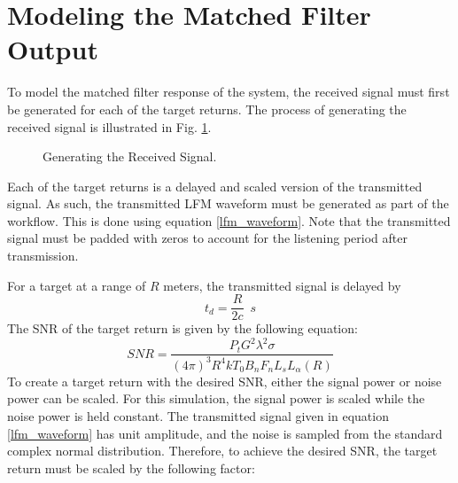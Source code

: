 \documentclass[conference]{IEEEtran}
\begin{document}
\section{Modeling the Matched Filter Output}
\label{modeling_section}
To model the matched filter response of the system, the received signal must first be generated for each of the target returns. The process of generating the received signal is illustrated in Fig. \ref{gen_rx_sig}.
\begin{figure}[H]
\centerline{}
\caption{Generating the Received Signal.}
\label{gen_rx_sig}
\end{figure}
Each of the target returns is a delayed and scaled version of the transmitted signal. As such, the transmitted LFM waveform must be generated as part of the workflow. This is done using equation \eqref{lfm_waveform}. Note that the transmitted signal must be padded with zeros to account for the listening period after transmission.
\par
For a target at a range of $R$ meters, the transmitted signal is delayed by
\begin{equation}
t_d = \frac{R}{2c} \enspace s
\end{equation}
The SNR of the target return is given by the following equation:
\begin{equation}
SNR = \frac{P_t G^2 \lambda^2 \sigma}{(4\pi)^3 R^4 k T_0 B_n F_n L_s L_\alpha(R)}
\label{snr_formula}
\end{equation}
To create a target return with the desired SNR, either the signal power or noise power can be scaled. For this simulation, the signal power is scaled while the noise power is held constant. The transmitted signal given in equation \eqref{lfm_waveform} has unit amplitude, and the noise is sampled from the standard complex normal distribution. Therefore, to achieve the desired SNR, the target return must be scaled by the following factor:
\end{document}
